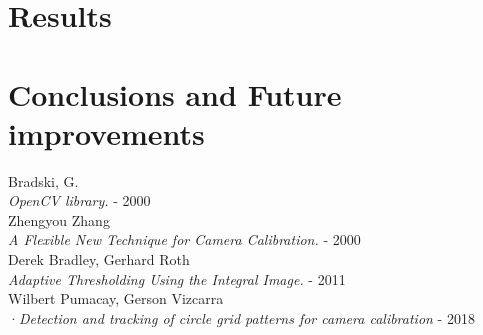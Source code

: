 \documentclass[journal]{IEEEtran}
\begin{document}
\section{Results}

\section{Conclusions and Future improvements}


\begin{thebibliography}{1}

  Bradski, G. \\
  \textit{OpenCV library.} - 2000
\\
  Zhengyou Zhang \\
  \textit{A Flexible New Technique for Camera Calibration.} - 2000
\\
  Derek Bradley, Gerhard Roth \\
  \textit{Adaptive Thresholding Using the Integral Image.} - 2011
\\
  Wilbert Pumacay, Gerson Vizcarra\\
  ·\textit{Detection and tracking of circle grid patterns for camera calibration} - 2018

\end{thebibliography}
\end{document}

